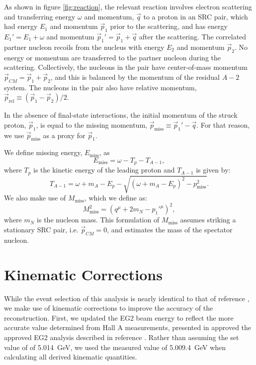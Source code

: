 \documentclass{article}
\begin{document}
As shown in figure \ref{fig:reaction}, the relevant reaction involves electron
scattering and transferring energy $\omega$ and momentum, $\vec{q}$ to a proton
in an SRC pair, which had energy $E_1$ and momentum $\vec{p}_1$ prior to the
scattering, and has energy $E_1' = E_1 + \omega$ and momentum $\vec{p}_1' = \vec{p}_1 + \vec{q}$
after the scattering. The correlated partner nucleon recoils from the nucleus with
energy $E_2$ and momentum $\vec{p}_2$. No energy or momentum are transferred to the
partner nucleon during the scattering. Collectively, the nucleons in the pair have
center-of-mass momentum $\vec{p}_{CM} = \vec{p}_1 + \vec{p}_2$, and this is balanced
by the momentum of the residual $A-2$ system. The nucleons in the pair also have
relative momentum, $\vec{p}_\text{rel} \equiv (\vec{p}_1 - \vec{p}_2)/2$.

In the absence of final-state interactions, the initial momentum of the struck proton, $\vec{p}_1$,
is equal to the missing momentum, $\vec{p}_\text{miss} \equiv \vec{p}_1' - \vec{q}$. 
For that reason, we use $\vec{p}_\text{miss}$ as a proxy for $\vec{p}_1$.

We define missing energy, $E_\text{miss}$, as
\begin{equation}
E_\text{miss} = \omega - T_p - T_{A-1},
\end{equation}
where $T_p$ is the kinetic energy of the leading proton and $T_{A-1}$ is given by:
\begin{equation}
T_{A-1} = \omega + m_A - E_p - \sqrt{(\omega + m_A - E_p)^2 - p_\text{miss}^2}.
\end{equation}
We also make use of $M_\text{miss}$, which we define as:
\begin{equation}
  M_\text{miss}^2 = (q^\mu + 2 m_N - p_1'^{\mu})^2,
\end{equation}
where $m_N$ is the nucleon mass. This formulation of $M_\text{miss}$ assumes striking
a stationary SRC pair, i.e. $\vec{p}_{CM}=0$, and estimates the mass of the spectator
nucleon. 

\section{Kinematic Corrections}

While the event selection of this analysis is nearly identical to that of reference
\cite{Or:note}, we make use of kinematic corrections to improve the accuracy of the
reconstruction. First, we updated the EG2 beam energy to reflect the more accurate value
determined from Hall A measurements, presented in approved the approved EG2 analysis
described in reference \cite{Barak:note}. Rather than assuming the set value of 
of 5.014~GeV, we used the measured value of 5.009.4~GeV when calculating all derived
kinematic quantities. 
\end{document}
